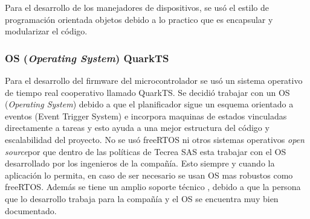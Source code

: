  Para el desarrollo de los manejadores de dispositivos, se usó el estilo de programación orientada objetos debido a lo practico que es encapsular y modularizar el código. %
 
 \subsubsection{OS (\textit{Operating System}) QuarkTS}
Para el desarrollo del firmware del microcontrolador se usó un sistema operativo de tiempo real cooperativo llamado QuarkTS\cite{Camilo2019}. Se decidió trabajar con un OS (\textit{Operating System}) debido a que el planificador sigue un esquema orientado a eventos (Event Trigger System) e incorpora maquinas de estados vinculadas directamente a tareas  y esto ayuda a una mejor estructura del código y escalabilidad del proyecto. No se usó freeRTOS ni otros sistemas operativos \textit{open source}\protect\footnotemark por que dentro de las políticas de Tecrea SAS esta trabajar con el OS desarrollado por los ingenieros de la compañía. Esto siempre y cuando la aplicación lo permita, en caso de ser necesario se usan OS mas robustos como freeRTOS. Además se tiene un amplio soporte técnico , debido a que la persona que lo desarrollo trabaja  para la compañía y el OS se encuentra muy bien documentado.

